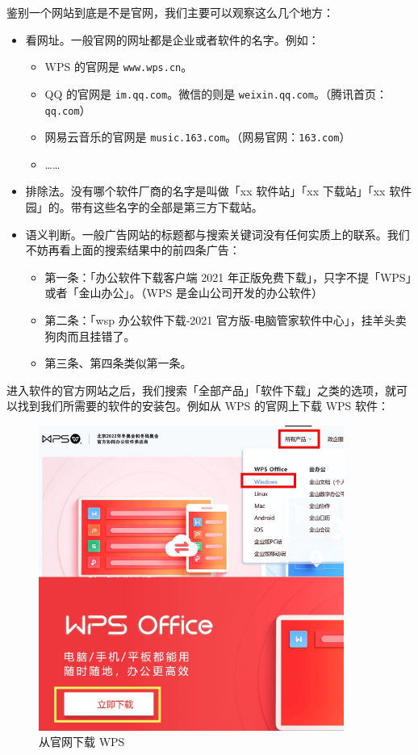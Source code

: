 鉴别一个网站到底是不是官网，我们主要可以观察这么几个地方：

\begin{itemize}
  \item 看网址。一般官网的网址都是企业或者软件的名字。例如：
  \begin{itemize}
    \item WPS 的官网是 \verb|www.wps.cn|。
    \item QQ 的官网是 \verb|im.qq.com|。微信的则是 \verb|weixin.qq.com|。（腾讯首页：\verb|qq.com|）
    \item 网易云音乐的官网是 \verb|music.163.com|。（网易官网：\verb|163.com|）
    \item ……
  \end{itemize}
  \item 排除法。没有哪个软件厂商的名字是叫做「xx 软件站」「xx 下载站」「xx 软件园」的。带有这些名字的全部是第三方下载站。
  \item 语义判断。一般广告网站的标题都与搜索关键词没有任何实质上的联系。我们不妨再看上面的搜索结果中的前四条广告：
  \begin{itemize}
    \item 第一条：「办公软件下载客户端 2021 年正版免费下载」，只字不提「WPS」或者「金山办公」。（WPS 是金山公司开发的办公软件）
    \item 第二条：「wsp 办公软件下载-2021 官方版-电脑管家软件中心」，挂羊头卖狗肉而且挂错了。
    \item 第三条、第四条类似第一条。
  \end{itemize}
\end{itemize}

进入软件的官方网站之后，我们搜索「全部产品」「软件下载」之类的选项，就可以找到我们所需要的软件的安装包。例如从 WPS 的官网上下载 WPS 软件：

\begin{figure}[htb!]
  \centering
  \includegraphics[width=10cm]{assets/Download_WPS.jpg}
  \caption{从官网下载 WPS}
  \label{download-wps}
\end{figure}

